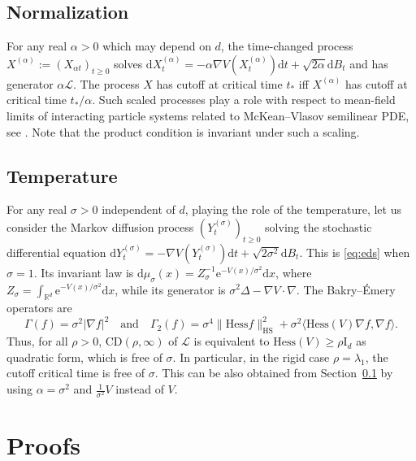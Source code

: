 \documentclass[10pt,reqno]{amsart}
\numberwithin{equation}{section}
\begin{document}
\subsection{Normalization}\label{ss:normalization}

For any real $\alpha>0$ which may depend on $d$, the time-changed process
$X^{(\alpha)}:={(X_{\alpha t})}_{t\geq0}$ solves 
$\mathrm{d}X^{(\alpha)}_t=-\alpha\nabla
V(X^{(\alpha)}_t)\mathrm{d}t+\sqrt{2\alpha}\mathrm{d}B_t$ and has generator
$\alpha\mathcal{L}$. The process $X$ has cutoff at critical time
$t_*$ iff $X^{(\alpha)}$ has cutoff at critical time $t_*/\alpha$.
Such scaled processes play a role with respect to mean-field limits of
interacting particle systems related to McKean--Vlasov semilinear PDE, see
\cite{BCL23}. Note that the product condition is invariant under such a scaling. 

\subsection{Temperature}

For any real $\sigma>0$ independent of $d$, playing the role of the
temperature, let us consider the Markov diffusion process
${(Y^{(\sigma)}_t)}_{t\geq0}$ solving the stochastic differential equation
$\mathrm{d}Y^{(\sigma)}_t=-\nabla
V(Y^{(\sigma)}_t)\mathrm{d}t+\sqrt{2\sigma^2}\mathrm{d}B_t$. This is
\eqref{eq:eds} when $\sigma=1$. Its invariant law is
$\mathrm{d}\mu_\sigma(x)=Z_\sigma^{-1}\mathrm{e}^{-V(x)/\sigma^2}\mathrm{d}x$,
where $Z_\sigma=\int_{\mathbb{R}^d}\mathrm{e}^{-V(x)/\sigma^2}\mathrm{d}x$,
while its generator is
$\sigma^2\Delta-\nabla V\cdot\nabla$. The Bakry--Émery operators are
 \begin{equation}
     \Gamma(f)=\sigma^2|\nabla f|^2
     \quad\text{and}\quad
     \Gamma_2(f)=\sigma^4\|\mathrm{Hess}f\|_{\mathrm{HS}}^2+\sigma^2\langle\mathrm{Hess}(V)\nabla f,\nabla f\rangle.
 \end{equation}
 Thus, for all $\rho>0$, $\mathrm{CD}(\rho,\infty)$ of $\mathcal{L}$ is equivalent to
 $\mathrm{Hess}(V)\geq\rho\mathrm{I}_d$ as quadratic form, which is free of
 $\sigma$. In particular, in the rigid case $\rho=\lambda_1$, the cutoff
 critical time is free of $\sigma$. This can be also obtained from
 Section~\ref{ss:normalization} by using $\alpha=\sigma^2$ and
 $\frac{1}{\sigma^2}V$ instead of $V$.

\section{Proofs}
\end{document}
